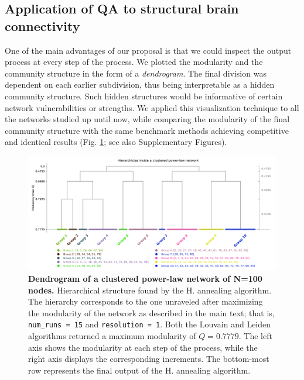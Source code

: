 \documentclass[pdflatex,sn-mathphys-num]{sn-jnl}%
\begin{document}
\subsection*{Application of QA to structural brain connectivity}
One of the main advantages of our proposal is that we could inspect the output process at every step of the process. We plotted the modularity and the community structure in the form of a \textit{dendrogram}. The final division was dependent on each earlier subdivision, thus being interpretable as a hidden community structure. Such hidden structures would be informative of certain network vulnerabilities or strengths. We applied this visualization technique to all the networks studied up until now, while comparing the modularity of the final community structure with the same benchmark methods achieving competitive and identical results (Fig. \ref{fig:dendro_pw}; see also Supplementary Figures).

\begin{figure}[h]
    \centering
    \includegraphics[width=1\linewidth]{Figures/Fig5.pdf}
    \caption{\textbf{Dendrogram of a clustered power-law network \cite{Holme2002} of N=100 nodes.} Hierarchical structure found by the H. annealing algorithm. The hierarchy corresponds to the one unraveled after maximizing the modularity of the network as described in the main text; that is, {\tt num\_runs = 15} and {\tt resolution = 1}. Both the Louvain and Leiden algorithms returned a maximum modularity of $Q=0.7779$. The left axis shows the modularity at each step of the process, while the right axis displays the corresponding increments. The bottom-most row represents the final output of the H. annealing algorithm.}
    \label{fig:dendro_pw}
\end{figure}
\end{document}
